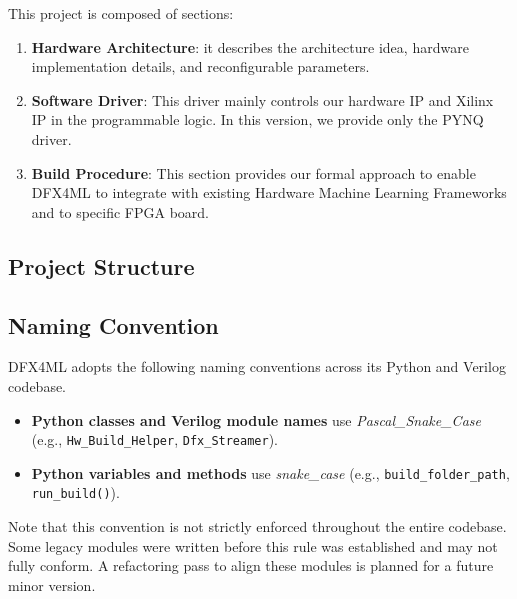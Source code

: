 \documentclass{cernatsnote}
\begin{document}
This project is composed of sections:
    \begin{enumerate}
    \item \textbf{Hardware Architecture}: it describes the architecture idea, hardware implementation details, and reconfigurable parameters.
    \item \textbf{Software Driver}: This driver mainly controls our hardware IP and Xilinx IP in the programmable logic. In this version, we provide only the PYNQ driver.
    \item \textbf{Build Procedure}: This section provides our formal approach to enable DFX4ML to integrate with existing Hardware Machine Learning Frameworks and to specific FPGA board.
    \end{enumerate}


    \subsection{Project Structure}



\subsection{Naming Convention}

DFX4ML adopts the following naming conventions across its Python and Verilog codebase.

\begin{itemize}
    \item \textbf{Python classes and Verilog module names} use \textit{Pascal\_Snake\_Case} \newline (e.g., \texttt{Hw\_Build\_Helper}, \texttt{Dfx\_Streamer}).
    \item \textbf{Python variables and methods} use \textit{snake\_case} (e.g., \texttt{build\_folder\_path}, \newline \texttt{run\_build()}).
\end{itemize}

Note that this convention is not strictly enforced throughout the entire codebase. Some legacy modules were written before this rule was established and may not fully conform. A refactoring pass to align these modules is planned for a future minor version.
\end{document}
